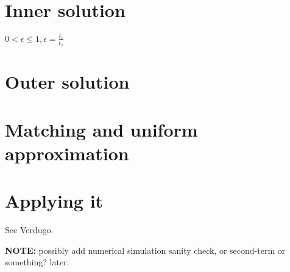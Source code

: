 \documentclass[12pt]{report}
\begin{document}
\section{Inner solution}

$0 < \epsilon \leq 1, \epsilon = \frac{t_{\epsilon}}{t_{s}}$

\section{Outer solution}

\section{Matching and uniform approximation}

\section{Applying it}

See Verdugo.

\textbf{NOTE:} possibly add numerical simulation sanity check, or second-term or
something? later.


\end{document}
